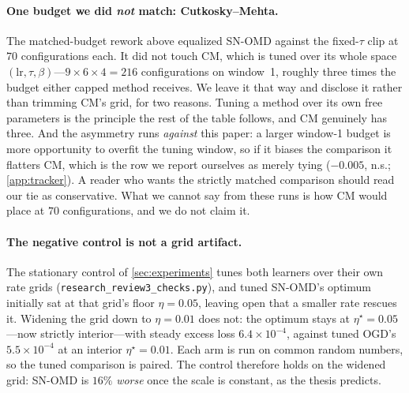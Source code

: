 \documentclass{article}
\begin{document}
\paragraph{One budget we did \emph{not} match: Cutkosky--Mehta.} The matched-budget rework
above equalized SN-OMD against the fixed-$\tau$ clip at $70$ configurations each. It did not
touch CM, which is tuned over its whole space $(\mathrm{lr},\tau,\beta)$---$9\times6\times4=216$
configurations on window~1, roughly three times the budget either capped method receives. We
leave it that way and disclose it rather than trimming CM's grid, for two reasons. Tuning a
method over its own free parameters is the principle the rest of the table follows, and CM
genuinely has three. And the asymmetry runs \emph{against} this paper: a larger window-1 budget
is more opportunity to overfit the tuning window, so if it biases the comparison it flatters CM,
which is the row we report ourselves as merely tying ($-0.005$, n.s.; \cref{app:tracker}). A
reader who wants the strictly matched comparison should read our tie as conservative. What we
cannot say from these runs is how CM would place at $70$ configurations, and we do not claim it.

\paragraph{The negative control is not a grid artifact.} The stationary control of
\cref{sec:experiments} tunes both learners over their own rate grids
(\texttt{research\_review3\_checks.py}), and tuned SN-OMD's optimum initially sat at that grid's
floor $\eta{=}0.05$, leaving open that a smaller rate rescues it. Widening the grid down to
$\eta{=}0.01$ does not: the optimum stays at $\eta^\star{=}0.05$---now strictly interior---with
steady excess loss $6.4\!\times\!10^{-4}$, against tuned OGD's $5.5\!\times\!10^{-4}$ at an
interior $\eta^\star{=}0.01$. Each arm is run on common random numbers, so the tuned comparison
is paired. The control therefore holds on the widened grid: SN-OMD is $16\%$ \emph{worse} once
the scale is constant, as the thesis predicts.
\end{document}
